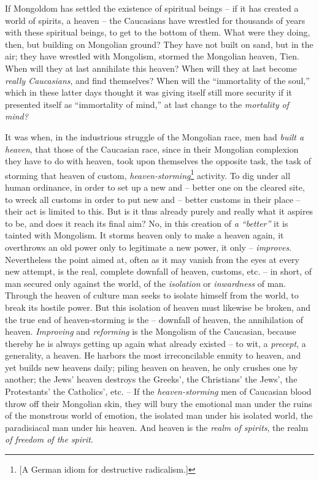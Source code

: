 \documentclass[12pt,a4paper]{book}
\begin{document}
If Mongoldom has settled the existence of spiritual beings -- if it has 
created a world of spirits, a heaven -- the Caucasians have wrestled for 
thousands of years with these spiritual beings, to get to the bottom of them. 
What were they doing, then, but building on Mongolian ground? They have not 
built on sand, but in the air; they have wrestled with Mongolism, stormed the 
Mongolian heaven, Tien. When will they at last annihilate this heaven? When 
will they at last become \textit{really Caucasians}, and find themselves? When 
will the ``immortality of the soul,'' which in these latter days thought it 
was giving itself still more security if it presented itself as ``immortality 
of mind,'' at last change to the \textit{mortality of mind?}

It was when, in the industrious struggle of the Mongolian race, men had 
\textit{built a heaven}, that those of the Caucasian race, since in their 
Mongolian complexion they have to do with heaven, took upon themselves the 
opposite task, the task of storming that heaven of custom, 
\textit{heaven-storming}\footnote{[A German idiom for destructive 
radicalism.]} activity. To dig under all human ordinance, in order to set up a 
new and -- better one on the cleared site, to wreck all customs in order to 
put new and -- better customs in their place -- their act is limited to this. 
But is it thus already purely and really what it aspires to be, and does it 
reach its final aim? No, in this creation of \textit{a ``better''} it is 
tainted with Mongolism. It storms heaven only to make a heaven again, it 
overthrows an old power only to legitimate a new power, it only -- 
\textit{improves}. Nevertheless the point aimed at, often as it may vanish 
from the eyes at every new attempt, is the real, complete downfall of heaven, 
customs, etc. -- in short, of man secured only against the world, of the 
\textit{isolation} or \textit{inwardness} of man. Through the heaven of 
culture man seeks to isolate himself from the world, to break its hostile 
power. But this isolation of heaven must likewise be broken, and the true end 
of heaven-storming is the -- downfall of heaven, the annihilation of heaven. 
\textit{Improving} and \textit{reforming} is the Mongolism of the Caucasian, 
because thereby he is always getting up again what already existed -- to wit, 
a \textit{precept}, a generality, a heaven. He harbors the most irreconcilable 
enmity to heaven, and yet builds new heavens daily; piling heaven on heaven, 
he only crushes one by another; the Jews' heaven destroys the Greeks', the 
Christians' the Jews', the Protestants' the Catholics', etc. -- If the 
\textit{heaven-storming} men of Caucasian blood throw off their Mongolian 
skin, they will bury the emotional man under the ruins of the monstrous world 
of emotion, the isolated man under his isolated world, the paradisiacal man 
under his heaven. And heaven is the \textit{realm of spirits}, the realm 
\textit{of freedom of the spirit}.
\end{document}
